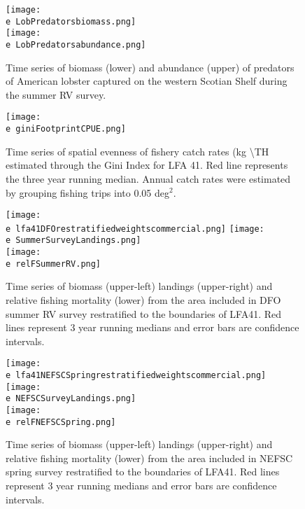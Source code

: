 \documentclass[11pt]{article}
\newcommand{\e}{/backup/bio_data/bio.lobster/figures/} %
\begin{document}

\begin{figure}
\centering
    \texttt{[image: \\e LobPredatorsbiomass.png]}\\
    \texttt{[image: \\e LobPredatorsabundance.png]}\\
    \caption{Time series of biomass (lower) and abundance (upper) of predators of American lobster captured on the western Scotian Shelf during the summer RV survey.}

\end{figure}




\begin{figure}

    \texttt{[image: \\e giniFootprintCPUE.png]}
    \caption{Time series of spatial evenness of fishery catch rates (kg \textbackslash TH estimated through the Gini Index for LFA 41. Red line represents the three year running median. Annual catch rates were estimated by grouping fishing trips into 0.05 deg$^2$.}

\end{figure}



\begin{figure}

    \texttt{[image: \\e lfa41DFOrestratifiedweightscommercial.png]}
    \texttt{[image: \\e SummerSurveyLandings.png]} \\
    \texttt{[image: \\e relFSummerRV.png]} \\
    \caption{Time series of biomass (upper-left) landings (upper-right) and relative fishing mortality (lower) from the area included in DFO summer RV survey restratified to the boundaries of LFA41. Red lines represent 3 year running medians and error bars are confidence intervals.}

\end{figure}


\begin{figure}

    \texttt{[image: \\e lfa41NEFSCSpringrestratifiedweightscommercial.png]}
    \texttt{[image: \\e NEFSCSurveyLandings.png]} \\
    \texttt{[image: \\e relFNEFSCSpring.png]} \\
    \caption{Time series of biomass (upper-left) landings (upper-right) and relative fishing mortality (lower) from the area included in NEFSC spring survey restratified to the boundaries of LFA41. Red lines represent 3 year running medians and error bars are confidence intervals.}

\end{figure}
\end{document}
